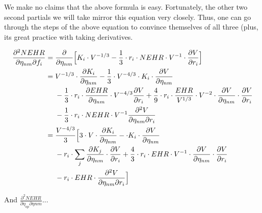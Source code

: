 \documentclass[12pt]{article}
\begin{document}
We make no claims that the above formula is easy. Fortunately, the other two
second partials we will take mirror this equation very closely. Thus, one
can go through the steps of the above equation to convince themselves of all
three (plus, its great practice with taking derivatives.

\begin{align}
\frac{\partial^2 NEHR}{ \partial \eta_{nm} \partial f_i} &= \frac{\partial}{%
\partial \eta_{nm}}\Big[K_i \cdot V^{-1/3} - \frac{1}{3} \cdot r_i \cdot
NEHR \cdot V^{-1}\cdot \frac{\partial V}{\partial r_i}\Big] \\
&=V^{-1/3} \cdot \frac{\partial K_i}{\partial \eta_{nm}} - \frac{1}{3}\cdot
V^{-4/3} \cdot K_i \cdot \frac{\partial V}{\partial \eta_{nm}}  \notag \\
&\ \ \ \ - \frac{1}{3} \cdot r_i \cdot \frac{\partial EHR}{\partial \eta_{nm}%
} \cdot V^{-4/3} \frac{\partial V}{\partial r_i} + \frac{4}{9} \cdot r_i
\cdot \frac{EHR}{V^{1/3}} \cdot V^{-2} \cdot \frac{\partial V}{\partial
\eta_{nm}} \cdot \frac{\partial V}{\partial r_i}  \notag \\
&\ \ \ \ - \frac{1}{3} \cdot r_i\cdot NEHR \cdot V^{-1} \frac{\partial^2 V}{%
\partial \eta_{nm} \partial r_i}  \label{eq.NEHR_Part_f_eta_pre} \\
&= \frac{V^{-4/3}}{3} \Big[3 \cdot V \cdot \frac{\partial K_i}{\partial
\eta_{nm}} - \cdot K_i \cdot \frac{\partial V}{\partial \eta_{nm}}  \notag \\
&\ \ \ \ - r_i \cdot \sum_{j}{\frac{\partial K_j}{\partial \eta_{nm}}} \cdot 
\frac{\partial V}{\partial r_i} + \frac{4}{3} \cdot r_i \cdot EHR \cdot
V^{-1} \cdot \frac{\partial V}{\partial\eta_{nm}} \cdot \frac{\partial V}{%
\partial r_i}  \notag \\
&\ \ \ \ - r_i \cdot EHR \cdot \frac{\partial^2 V}{\partial \eta_{nm}
\partial r_i}\Big]  \label{eq.NEHR_Part_f_eta}
\end{align}

And $\frac{\partial ^{2}NEHR}{\partial \eta _{op}\partial \eta {nm}}$...
\end{document}
